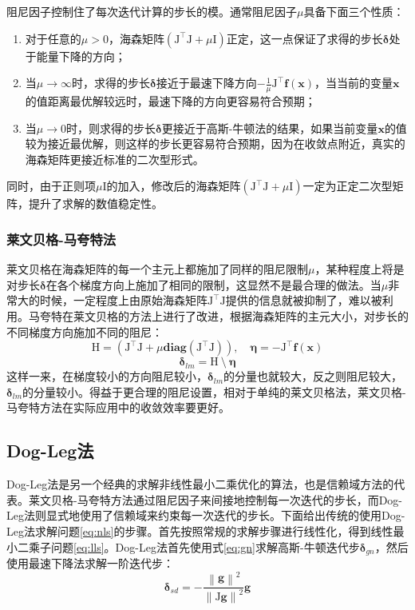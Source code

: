 阻尼因子控制住了每次迭代计算的步长的模。通常阻尼因子$\mu$具备下面三个性质\citep{tingleff2004methods}：
\begin{enumerate}
    \item 对于任意的$\mu>0$，海森矩阵$(\mathrm{J}^\top\mathrm{J}+\mu\mathrm{I})$正定，这一点保证了求得的步长$\bm{\delta}$处于能量下降的方向；
    \item 当$\mu\to\infty$时，求得的步长$\bm{\delta}$接近于最速下降方向$-\frac{1}{\mu}\mathrm{J}^\top\bm{f}(\bm{x})$，当当前的变量$\bm{x}$ 的值距离最优解较远时，最速下降的方向更容易符合预期；
    \item 当$\mu\to0$时，则求得的步长$\bm{\delta}$更接近于高斯-牛顿法的结果，如果当前变量$\bm{x}$的值较为接近最优解，则这样的步长更容易符合预期，因为在收敛点附近，真实的海森矩阵更接近标准的二次型形式。
\end{enumerate}
同时，由于正则项$\mu\mathrm{I}$的加入，修改后的海森矩阵$(\mathrm{J}^\top\mathrm{J}+\mu\mathrm{I})$一定为正定二次型矩阵，提升了求解的数值稳定性。

\subsubsection{莱文贝格-马夸特法}

莱文贝格在海森矩阵的每一个主元上都施加了同样的阻尼限制$\mu$，某种程度上将是对步长$\bm{\delta}$在各个梯度方向上施加了相同的限制，这显然不是最合理的做法。当$\mu$非常大的时候，一定程度上由原始海森矩阵$\mathrm{J}^\top\mathrm{J}$提供的信息就被抑制了，难以被利用。马夸特在莱文贝格的方法上进行了改进，根据海森矩阵的主元大小，对步长的不同梯度方向施加不同的阻尼：
\begin{equation}
    \mathrm{H} = \left( \mathrm{J}^\top\mathrm{J}+\mu\mathbf{diag}(\mathrm{J}^\top\mathrm{J}) \right), \quad
    \bm{\eta}  = -\mathrm{J}^\top\bm{f}(\bm{x})
\end{equation}
\begin{equation}
    \bm{\delta}_{lm} = \mathrm{H} \:\setminus\: \bm{\eta}
    \label{eq:lm}
\end{equation}
这样一来，在梯度较小的方向阻尼较小，$\bm{\delta}_{lm}$的分量也就较大，反之则阻尼较大，$\bm{\delta}_{lm}$的分量较小。得益于更合理的阻尼设置，相对于单纯的莱文贝格法，莱文贝格-马夸特方法在实际应用中的收敛效率要更好。

\subsection{Dog-Leg法}

Dog-Leg法是另一个经典的求解非线性最小二乘优化的算法，也是信赖域方法的代表。莱文贝格-马夸特方法通过阻尼因子来间接地控制每一次迭代的步长，而Dog-Leg法则显式地使用了信赖域来约束每一次迭代的步长。下面给出传统的使用Dog-Leg法求解问题\eqref{eq:nls}的步骤\citep{tingleff2004methods}。首先按照常规的求解步骤进行线性化，得到线性最小二乘子问题\eqref{eq:lls}。Dog-Leg法首先使用式\eqref{eq:gn}求解高斯-牛顿迭代步$\bm{\delta}_{gn}$，然后使用最速下降法求解一阶迭代步：
\begin{equation}
    \bm{\delta}_{sd} = -\frac{\left\|\bm{g}\right\|^2}
                             {\left\|\mathrm{J}\bm{g}\right\|^2} \bm{g}
    \label{eq:sd}
\end{equation}

